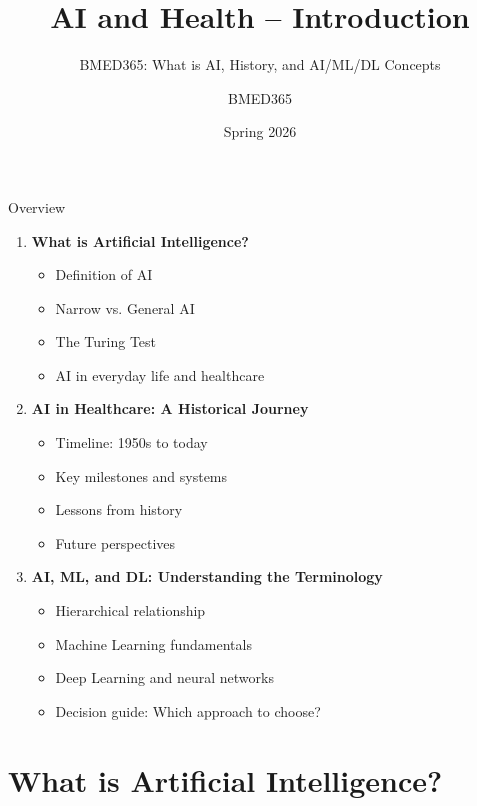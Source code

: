 \documentclass[aspectratio=169, 10pt]{beamer}
\title{AI and Health -- Introduction}
\subtitle{BMED365: What is AI, History, and AI/ML/DL Concepts}
\author{BMED365}
\date{Spring 2026}
\begin{document}
\begin{frame}
    \titlepage
\end{frame}

\begin{frame}{Overview}
    \begin{enumerate}
        \item \textbf{What is Artificial Intelligence?}
        \begin{itemize}
            \item Definition of AI
            \item Narrow vs. General AI
            \item The Turing Test
            \item AI in everyday life and healthcare
        \end{itemize}
        \item \textbf{AI in Healthcare: A Historical Journey}
        \begin{itemize}
            \item Timeline: 1950s to today
            \item Key milestones and systems
            \item Lessons from history
            \item Future perspectives
        \end{itemize}
        \item \textbf{AI, ML, and DL: Understanding the Terminology}
        \begin{itemize}
            \item Hierarchical relationship
            \item Machine Learning fundamentals
            \item Deep Learning and neural networks
            \item Decision guide: Which approach to choose?
        \end{itemize}
    \end{enumerate}
\end{frame}

\section{What is Artificial Intelligence?}
\end{document}
